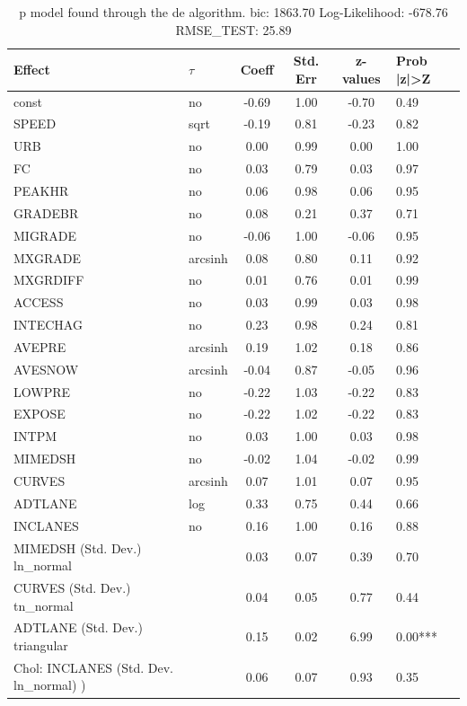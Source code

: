 \begin{table}
	\caption{p model found through the de algorithm. bic: 1863.70 Log-Likelihood: -678.76 RMSE_TEST: 25.89}
	\begin{center}
		\begin{tabular}{|l|l|c|c|c|l|}
			\hline
			Effect & $\tau$ & Coeff & Std. Err & z-values & Prob |z|>Z \\
			\hline
			const & no & -0.69 & 1.00 & -0.70 & 0.49 \\
			\hline
			SPEED & sqrt & -0.19 & 0.81 & -0.23 & 0.82 \\
			\hline
			URB & no & 0.00 & 0.99 & 0.00 & 1.00 \\
			\hline
			FC & no & 0.03 & 0.79 & 0.03 & 0.97 \\
			\hline
			PEAKHR & no & 0.06 & 0.98 & 0.06 & 0.95 \\
			\hline
			GRADEBR & no & 0.08 & 0.21 & 0.37 & 0.71 \\
			\hline
			MIGRADE & no & -0.06 & 1.00 & -0.06 & 0.95 \\
			\hline
			MXGRADE & arcsinh & 0.08 & 0.80 & 0.11 & 0.92 \\
			\hline
			MXGRDIFF & no & 0.01 & 0.76 & 0.01 & 0.99 \\
			\hline
			ACCESS & no & 0.03 & 0.99 & 0.03 & 0.98 \\
			\hline
			INTECHAG & no & 0.23 & 0.98 & 0.24 & 0.81 \\
			\hline
			AVEPRE & arcsinh & 0.19 & 1.02 & 0.18 & 0.86 \\
			\hline
			AVESNOW & arcsinh & -0.04 & 0.87 & -0.05 & 0.96 \\
			\hline
			LOWPRE & no & -0.22 & 1.03 & -0.22 & 0.83 \\
			\hline
			EXPOSE & no & -0.22 & 1.02 & -0.22 & 0.83 \\
			\hline
			INTPM & no & 0.03 & 1.00 & 0.03 & 0.98 \\
			\hline
			MIMEDSH & no & -0.02 & 1.04 & -0.02 & 0.99 \\
			\hline
			CURVES & arcsinh & 0.07 & 1.01 & 0.07 & 0.95 \\
			\hline
			ADTLANE & log & 0.33 & 0.75 & 0.44 & 0.66 \\
			\hline
			INCLANES & no & 0.16 & 1.00 & 0.16 & 0.88 \\
			\hline
			MIMEDSH (Std. Dev.) ln_normal &  & 0.03 & 0.07 & 0.39 & 0.70 \\
			\hline
			CURVES (Std. Dev.) tn_normal &  & 0.04 & 0.05 & 0.77 & 0.44 \\
			\hline
			ADTLANE (Std. Dev.) triangular &  & 0.15 & 0.02 & 6.99 & 0.00*** \\
			\hline
			 Chol: INCLANES (Std. Dev. ln_normal) ) &  & 0.06 & 0.07 & 0.93 & 0.35 \\
			\hline
		\end{tabular}
	\end{center}
\end{table}